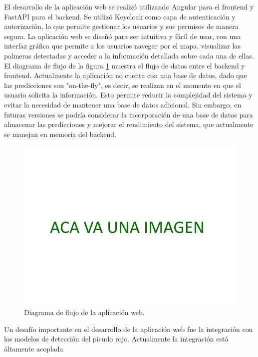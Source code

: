El desarrollo de la aplicación web se realizó utilizando Angular para el frontend y FastAPI para el backend. Se utilizó Keycloak como capa de autenticación y autorización, lo que permite gestionar los usuarios y sus permisos de manera segura. La aplicación web se diseñó para ser intuitiva y fácil de usar, con una interfaz gráfica que permite a los usuarios navegar por el mapa, visualizar las palmeras detectadas y acceder a la información detallada sobre cada una de ellas. El diagrama de flujo de la figura \ref{fig:diagrama-flujo-app} muestra el flujo de datos entre el backend y frontend. Actualmente la aplicación no cuenta con una base de datos, dado que las predicciones son "on-the-fly", es decir, se realizan en el momento en que el usuario solicita la información. Esto permite reducir la complejidad del sistema y evitar la necesidad de mantener una base de datos adicional. Sin embargo, en futuras versiones se podría considerar la incorporación de una base de datos para almacenar las predicciones y mejorar el rendimiento del sistema, que actualmente se manejan en memoria del backend.

\begin{figure}[H]
  \centering
  \includegraphics[scale=0.12]{./Figures/place-holder.png}
  \caption{Diagrama de flujo de la aplicación web.}
  \label{fig:diagrama-flujo-app}
\end{figure}

Un desafío importante en el desarrollo de la aplicación web fue la integración con los modelos de detección del picudo rojo. Actualmente la integración está áltamente acoplada 

